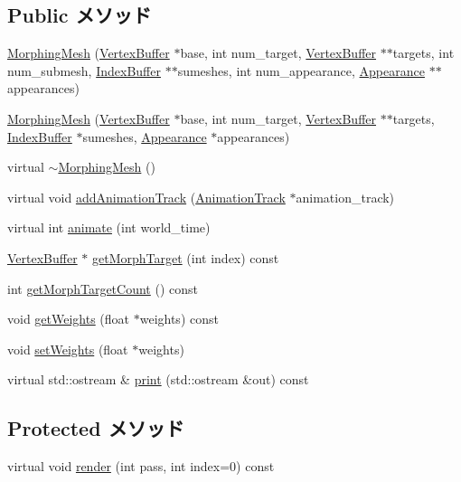 \subsection*{Public メソッド}
\begin{CompactItemize}
\item 
\hyperlink{classm3g_1_1MorphingMesh_34180323c022d357e1d9b55e4df5c544}{MorphingMesh} (\hyperlink{classm3g_1_1VertexBuffer}{VertexBuffer} $\ast$base, int num\_\-target, \hyperlink{classm3g_1_1VertexBuffer}{VertexBuffer} $\ast$$\ast$targets, int num\_\-submesh, \hyperlink{classm3g_1_1IndexBuffer}{IndexBuffer} $\ast$$\ast$sumeshes, int num\_\-appearance, \hyperlink{classm3g_1_1Appearance}{Appearance} $\ast$$\ast$appearances)
\item 
\hyperlink{classm3g_1_1MorphingMesh_7b950b24923a93c59542954caff0b00c}{MorphingMesh} (\hyperlink{classm3g_1_1VertexBuffer}{VertexBuffer} $\ast$base, int num\_\-target, \hyperlink{classm3g_1_1VertexBuffer}{VertexBuffer} $\ast$$\ast$targets, \hyperlink{classm3g_1_1IndexBuffer}{IndexBuffer} $\ast$sumeshes, \hyperlink{classm3g_1_1Appearance}{Appearance} $\ast$appearances)
\item 
virtual \hyperlink{classm3g_1_1MorphingMesh_cdafafba64a0167f28f3b66ac4b9d7d6}{$\sim$MorphingMesh} ()
\item 
virtual void \hyperlink{classm3g_1_1MorphingMesh_415c0b110f95410ded9b85e5d99a496b}{addAnimationTrack} (\hyperlink{classm3g_1_1AnimationTrack}{AnimationTrack} $\ast$animation\_\-track)
\item 
virtual int \hyperlink{classm3g_1_1MorphingMesh_8aad1ceab4c2a03609c8a42324ce484d}{animate} (int world\_\-time)
\item 
\hyperlink{classm3g_1_1VertexBuffer}{VertexBuffer} $\ast$ \hyperlink{classm3g_1_1MorphingMesh_44766cc08b595f074d0d698c75f544b4}{getMorphTarget} (int index) const 
\item 
int \hyperlink{classm3g_1_1MorphingMesh_620d9684124201f738a28c7c39641541}{getMorphTargetCount} () const 
\item 
void \hyperlink{classm3g_1_1MorphingMesh_80cef3b2c5e4881567409829de224e46}{getWeights} (float $\ast$weights) const 
\item 
void \hyperlink{classm3g_1_1MorphingMesh_53e2beef0efdccecfe4d7ab7b719c738}{setWeights} (float $\ast$weights)
\item 
virtual std::ostream \& \hyperlink{classm3g_1_1MorphingMesh_6fea17fa1532df3794f8cb39cb4f911f}{print} (std::ostream \&out) const 
\end{CompactItemize}
\subsection*{Protected メソッド}
\begin{CompactItemize}
\item 
virtual void \hyperlink{classm3g_1_1MorphingMesh_1efcb1973989d9963d5bd6d03065d389}{render} (int pass, int index=0) const 
\end{CompactItemize}


